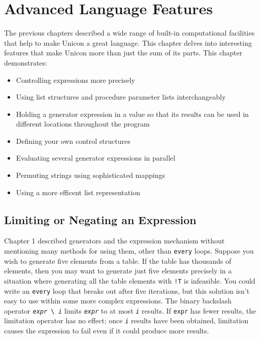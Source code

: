 \chapter{Advanced Language Features}

The previous chapters described a wide range of built-in computational
facilities that help to make Unicon a great language.
This chapter delves into interesting features that make Unicon
more than just the sum of its parts. This chapter demonstrates:

\begin{itemize}\itemsep0pt
\item Controlling expressions more precisely
\item Using list structures and procedure parameter lists
interchangeably
\item Holding a generator expression in a value so that
its results can be used in different locations throughout the program
\item Defining your own control structures
\item Evaluating several generator expressions in parallel
\item Permuting strings using sophisticated mappings
\item Using a more efficent list representation
\end{itemize}

\section{Limiting or Negating an Expression}

Chapter 1 described generators and the
expression mechanism without mentioning many methods for using them,
other than \texttt{every} loops. Suppose you wish to generate five
elements from a table. If the table has thousands of elements, then you
may want to generate just five elements precisely in a situation where
generating all the table elements with \texttt{!T} is infeasible. You
could write an \texttt{every} loop that breaks out after five
iterations, but this solution isn't easy to use within
some more complex expressions. The binary backslash operator
\texttt{\textit{expr}}\texttt{ {\textbackslash} }\texttt{\textit{i}}
limits \texttt{\textit{expr}} to at most \texttt{\textit{i}} results.
If \texttt{expr} has fewer results, the limitation operator has no
effect; once \texttt{\textit{i}} results have been obtained, limitation
causes the expression to fail even if it
could produce more results.

